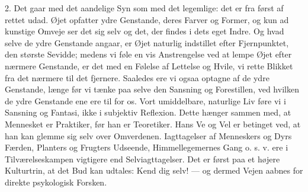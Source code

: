 \documentclass[12pt,a4paper,openany]{book}
\newcommand{\opage}[1]{\marginnote{\footnotesize\textit{[#1]}}}
\begin{document}
\opage{2}2. Det gaar med det aandelige Syn som med det legemlige: det er
fra først af rettet udad. Øjet opfatter ydre Genstande, deres Farver og
Former, og kun ad kunstige Omveje ser det sig selv og det, der findes i
dets eget Indre. Og hvad selve de ydre Genstande angaar, er Øjet
naturlig indstillet efter Fjernpunktet, den største Sevidde; medens vi
føle en vis Anstrengelse ved at lempe Øjet efter nærmere Genstande, er
det med en Følelse af Lettelse og Hvile, vi rette Blikket fra det
nærmere til det fjernere. Saaledes ere vi ogsaa optagne af de ydre
Genstande, længe før vi tænke paa selve den Sansning og Forestillen, ved
hvilken de ydre Genstande ene ere til for os. Vort umiddelbare,
naturlige Liv føre vi i Sansning og Fantasi, ikke i subjektiv Reflexion.
Dette hænger sammen med, at Mennesket er Praktiker, før han er
Teoretiker. Hans Ve og Vel er betinget ved, at han kan glemme sig selv
over Omverdenen. Iagttagelser af Menneskers og Dyrs Færden, Planters og
Frugters Udseende, Himmellegemernes Gang o. s. v. ere i
Tilværelseskampen vigtigere end Selviagttagelser. Det er først paa et
højere Kulturtrin, at det Bud kan udtales: Kend dig selv! --- og dermed
Vejen aabnes for direkte psykologisk Forsken.
\end{document}
